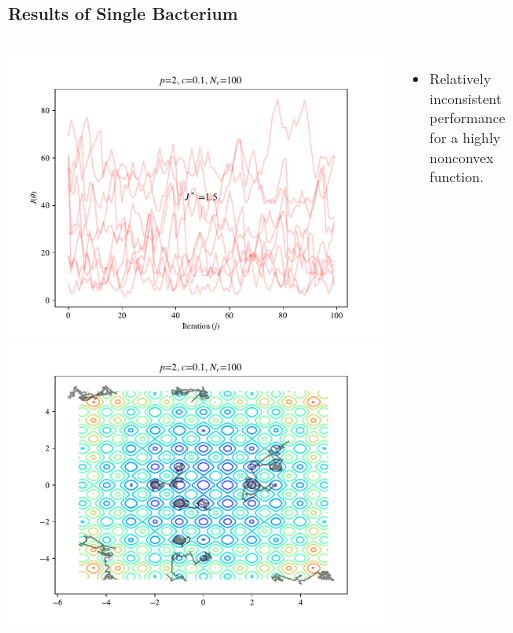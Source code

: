 \documentclass{beamer}
\begin{document}
\begin{frame}
\frametitle{Results of Single Bacterium}
\begin{columns}
    \begin{center}
      \includegraphics[scale=0.3]{assets/rastrigin_J}
      \includegraphics[scale=0.3]{assets/rastrigin_theta}
    \end{center}
    \begin{itemize}
      \item Relatively inconsistent performance for a highly nonconvex function.
    \end{itemize}
\end{columns}
\end{frame}
\end{document}
